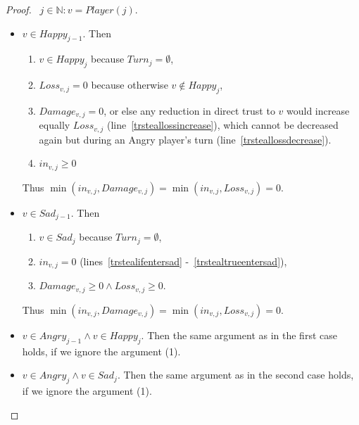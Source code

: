 \documentclass[11pt]{article}
\theoremstyle{definition}
\theoremstyle{corollary}
\theoremstyle{lemma}
\begin{document}
    \begin{proof} \ 
       $j \in \mathbb{N}: v = Player(j)$.
       \begin{itemize}
          \item $v \in Happy_{j-1}$. Then
          \begin{enumerate}
             \item $v \in Happy_j$ because $Turn_{j} = \emptyset$,
             \item $Loss_{v, j} = 0$ because otherwise $v \notin Happy_j$,
             \item $Damage_{v, j} = 0$, or else any reduction in direct trust to $v$ would increase equally
             $Loss_{v, j}$ (line~\ref{trsteallossincrease}), which cannot be decreased again but during an Angry player's turn
             (line~\ref{trsteallossdecrease}).
             \item $in_{v, j} \geq 0$
          \end{enumerate}
          Thus $\min(in_{v, j}, Damage_{v,j}) = \min(in_{v, j}, Loss_{v,j}) = 0$.
          \item $v \in Sad_{j-1}$. Then
          \begin{enumerate}
             \item $v \in Sad_j$ because $Turn_{j} = \emptyset$, 
             \item $in_{v, j} = 0$ (lines~\ref{trstealifentersad} -~\ref{trstealtrueentersad}),
             \item $Damage_{v, j} \geq 0 \wedge Loss_{v, j} \geq 0$.
          \end{enumerate}
          Thus $\min(in_{v, j}, Damage_{v,j}) = \min(in_{v, j}, Loss_{v,j}) = 0$.
          \item $v \in Angry_{j-1} \wedge v \in Happy_j$. Then the same argument as in the first case holds, if
          we ignore the argument (1).
          \item $v \in Angry_j \wedge v \in Sad_j$. Then the same argument as in the second case holds, if 
          we ignore the argument (1).
       \end{itemize}
    \end{proof}
\end{document}
